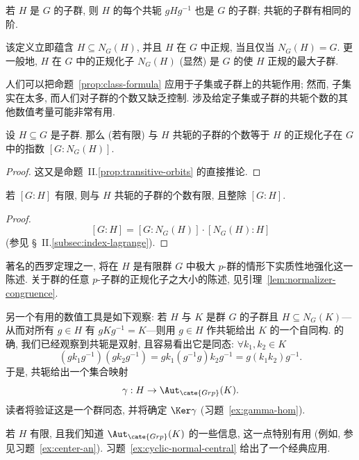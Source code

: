 若 $H$ 是 $G$ 的子群, 则 $H$ 的每个共轭 $gHg^{-1}$ 也是 $G$ 的子群; 共轭的子群有相同的阶.

\begin{remark}
\label{rem:normalizer}
该定义立即蕴含 $H \subseteq N_G(H)$, 并且 $H$ 在 $G$ 中正规, 当且仅当 $N_G(H) = G$. 更一般地, $H$ 在 $G$ 中的正规化子 $N_G(H)$ (显然) 是 $G$ 的使 $H$ 正规的最大子群.
\end{remark}

人们可以把命题~\ref{prop:class-formula} 应用于子集或子群上的共轭作用; 然而, 子集实在太多, 而人们对子群的个数又缺乏控制. 涉及给定子集或子群的共轭个数的其他数值考量可能非常有用.

\begin{lemma}
\label{lem:number-of-conjugates}
设 $H \subseteq G$ 是子群. 那么 (若有限) 与 $H$ 共轭的子群的个数等于 $H$ 的正规化子在 $G$ 中的指数 $[G:N_G(H)]$.
\end{lemma}

\begin{proof}
这又是命题~II.\ref{prop:transitive-orbits} 的直接推论.
\end{proof}

\begin{corollary}
\label{cor:conjugates-divide}
若 $[G:H]$ 有限, 则与 $H$ 共轭的子群的个数有限, 且整除 $[G:H]$.
\end{corollary}

\begin{proof}
\[
[G:H] = [G:N_G(H)] \cdot [N_G(H):H]
\]
(参见 \S~II.\ref{subsec:index-lagrange}).
\end{proof}

著名的西罗定理之一, 将在 $H$ 是有限群 $G$ 中极大 $p$-群的情形下实质性地强化这一陈述. 关于群的任意 $p$-子群的正规化子之大小的陈述, 见引理~\ref{lem:normalizer-congruence}.

另一个有用的数值工具是如下观察: 若 $H$ 与 $K$ 是群 $G$ 的子群且 $H \subseteq N_G(K)$---从而对所有 $g \in H$ 有 $gKg^{-1} = K$---则用 $g \in H$ 作共轭给出 $K$ 的一个自同构. 的确, 我们已经观察到共轭是双射, 且容易看出它是同态: $\forall k_1, k_2 \in K$
\[
(gk_1g^{-1})(gk_2g^{-1}) = gk_1(g^{-1}g)k_2g^{-1} = g(k_1k_2)g^{-1}.
\]
于是, 共轭给出一个集合映射
\[
\gamma : H \to \Aut_{\cate{Grp}}(K).
\]
读者将验证这是一个群同态, 并将确定 $\Ker \gamma$ (习题~\ref{ex:gamma-hom}).

若 $H$ 有限, 且我们知道 $\Aut_{\cate{Grp}}(K)$ 的一些信息, 这一点特别有用 (例如, 参见习题~\ref{ex:center-an}). 习题~\ref{ex:cyclic-normal-central} 给出了一个经典应用.

